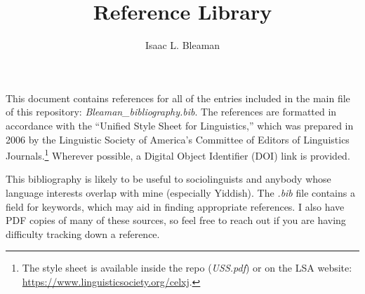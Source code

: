 \documentclass[12pt]{article}
\title{Reference Library}
\author{Isaac L. Bleaman}
\begin{document}
	\maketitle
	
	This document contains references for all of the entries included in the main  file of this repository: \textit{Bleaman\_bibliography.bib}. The references are formatted in accordance with the ``Unified Style Sheet for Linguistics,'' which was prepared in 2006 by the Linguistic Society of America's Committee of Editors of Linguistics Journals.\footnote{The style sheet is available inside the repo (\textit{USS.pdf}) or on the LSA website: \url{https://www.linguisticsociety.org/celxj}.} Wherever possible, a Digital Object Identifier (DOI) link is provided.
	
	This bibliography is likely to be useful to sociolinguists and anybody whose language interests overlap with mine (especially Yiddish). The \textit{.bib} file contains a field for keywords, which may aid in finding appropriate references. I also have PDF copies of many of these sources, so feel free to reach out if you are having difficulty tracking down a reference.
	
	\nocite{*}
	
	\newpage
	
	
	
\end{document}

